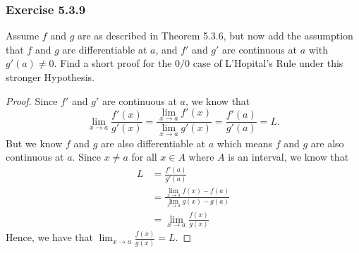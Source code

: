 \subsubsection{Exercise 5.3.9} Assume \( f  \) and \( g  \) are as described in Theorem 5.3.6, but now add the assumption that \( f  \) and \( g  \) are differentiable at \( a  \), and \( f' \) and \( g' \) are continuous at \( a  \) with \( g'(a) \neq 0  \). Find a short proof for the \( 0 / 0  \) case of L'Hopital's Rule under this stronger Hypothesis.
\begin{proof}
Since \( f'  \) and \( g'  \) are continuous at \( a  \), we know that 
\[  \lim_{ x \to a } \frac{ f'(x)  }{ g'(x)  } = \frac{ \lim_{ x \to a } f'(x)  }{ \lim_{ x \to a } g'(x)  }  = \frac{ f'(a)  }{ g'(a)  } = L. \]
But we know \( f  \) and \( g  \) are also differentiable at \( a  \) which means \( f  \) and \( g  \) are also continuous at \( a  \). Since \(x \neq a  \) for all \( x \in A  \) where \( A  \) is an interval, we know that 
\begin{align*}
   L  &= \frac{ f'(a)  }{ g'(a)  }  \\
      &= \frac{ \lim_{ x \to a } f(x) - f(a)  }{ \lim_{ x \to a } g(x) - g(a)  }  \\  
      &= \lim_{ x \to a } \frac{ f(x)  }{ g(x)  } \tag{\( f(a) = g(a) = 0  \)}
\end{align*}
Hence, we have that \( \lim_{ x \to a } \frac{ f(x)  }{ g(x)  }  = L \).
\end{proof}



